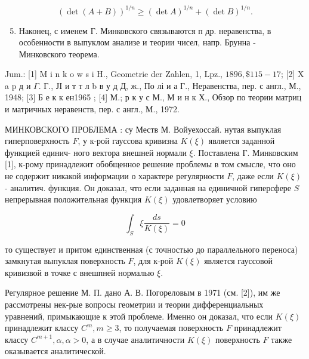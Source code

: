 \documentclass[10pt]{article}
\begin{document}
\[

(\operatorname{det}(A+B))^{1 / n} \geqslant(\operatorname{det} A)^{1 / n}+(\operatorname{det} B)^{1 / n} .

\]



\begin{enumerate}

  \setcounter{enumi}{4}

  \item Наконец, с именем Г. Минковского связываются п др. неравенства, в особенности в выпуклом анализе и теории чисел, напр. Брунна - Минковского теорема.

\end{enumerate}



Jum.: [1] M i n k o w s i H., Geometrie der Zahlen, 1, Lpz., $1896, \$ 115-17$; [2] X a p д и $\Gamma$. Г., ЈI и т т л b в у д Д, ж., По лі и а Г., Неравенства, пер. с англ., М., 1948; [3] Б е к к ен1965 ; [4] М.; р к у с М., М и н к Х., Обзор по теории матриц и матричных неравенств, пер. с англ., М., 1972.



МИНКОВСКОГО ПРОБЛЕМА : су Меств М. Войуехоссай. нутая выпуклая гиперповерхность $F$, у к-рой гауссова кривизна $K(\xi)$ является заданной функцией единич- ного вектора внешней нормали $\xi$. Поставлена Г. Минковским [1], к-рому принадлежит обобщенное решение проблемы в том смысле, что оно не содержит никакой информации о характере регулярности $F$, даже если $K(\xi)$ - аналитич. функция. Он доказал, что если заданная на единичной гиперсфере $S$ непрерывная положительная функция $K(\xi)$ удовлетворяет условию



\[

\int_{S} \xi \frac{d s}{K(\xi)}=0

\]



то существует и притом единственная (с точностью до параллельного переноса) замкнутая выпуклая поверхность $F$, для к-рой $K(\xi)$ является гауссовой кривизвой в точке с внешпней нормалью $\xi$.



Регулярное решение М. П. дано А. В. Погореловым в 1971 (см. [2]), им же рассмотрены нек-рые вопросы геометрии и теории дифференциальных уравнений, примыкающие к этой проблеме. Именно он доказал, что если $K(\xi)$ принадлежит классу $C^{m}, m \geqslant 3$, то получаемая поверхность $F$ принадлежит классу $C^{m+1}, \alpha, \alpha>0$, а в случае аналитичности $K(\xi)$ поверхность $F$ также оказывается аналитической.
\end{document}

